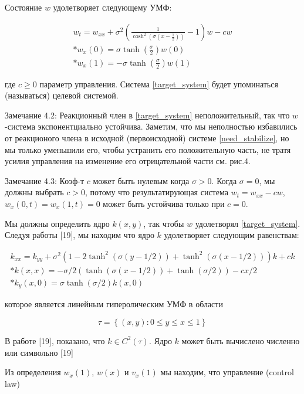 Состояние $w$ удолетворяет следующему УМФ:

\begin{gather}\label{target_system}
  w_t = w_{xx} + \sigma^2(\frac{1}{\cosh^2(\sigma(x - \frac{1}{2}))} - 1)w - cw\\*
  w_x(0) = \sigma\tanh(\frac{\sigma}{2})w(0) \\*
  w_x(1) = -\sigma\tanh(\frac{\sigma}{2})w(1)
\end{gather}

где $c \ge 0$ параметр управления. Система \eqref{target_system} будет упоминаться (называться) целевой системой.

Замечание 4.2: Реакционный член в \eqref{target_system} неположительный, так что $w$-система экспонентциально устойчива. Заметим, что мы неполностью избавились от реакционого члена в исходной (первоисходной) системе \eqref{need_stabilize}, но мы только уменьшили его, чтобы устранить его положительную часть, не тратя усилия управления на изменение его отрицательной части см. рис.4.

Замечание 4.3: Коэф-т $c$ может быть нулевым когда $\sigma > 0$. Когда $\sigma = 0$, мы должны выбрать $c > 0$, потому что результатирующая система $w_t = w_{xx} - cw$, $w_x(0, t) = w_x(1, t) = 0$ может быть устойчива только при $c = 0$.

Мы должны определить ядро $k(x, y)$, так чтобы $w$ удолетворял \eqref{target_system}. Следуя работы [19], мы находим что ядро $k$ удолетворяет следующим равенствам:

\begin{gather}
  k_{xx} = k_{yy} + \sigma^2(1 - 2\tanh^2{(\sigma(y - 1/2))} + \tanh^2{(\sigma(x - 1/2))})k + ck\\*
  k(x, x) = -\sigma/2(\tanh{(\sigma(x - 1/2))} + \tanh{(\sigma/2)}) - cx/2\\*
  k_y(x, 0) = \sigma\tanh{(\sigma/2)}k(x, 0)
\end{gather}

которое является линейным гиперолическим УМФ в области 

\begin{equation}
  \tau = \left\{(x, y): 0 \le y \le x \le 1 \right\}
\end{equation}

В работе [19], показано, что $k \in C^2(\tau)$. Ядро $k$ может быть вычислено численно или символьно [19]

Из определения $w_x(1)$, $w(x)$ и $v_x(1)$ мы находим, что управление (control law)

